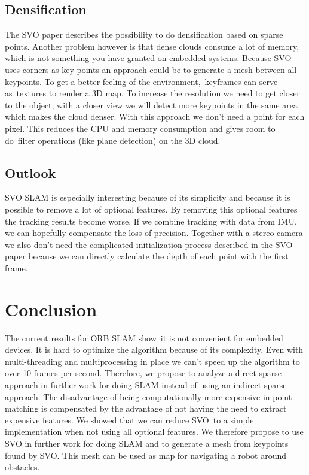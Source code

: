 \documentclass[11pt,a4paper,titlepage,oneside]{report}
\begin{document}
\section{Densification}

The SVO paper describes the possibility to do densification based on sparse points. Another problem however is that dense clouds consume a lot of memory, which is not something you have granted on embedded systems. Because SVO uses corners as key points an approach could be to generate a mesh between all keypoints. To get a better feeling of the environment, keyframes can serve as textures to render a 3D map. To increase the resolution we need to get closer to the object, with a closer view we will detect more keypoints in the same area which makes the cloud denser. With this approach we don't need a point for each pixel. This reduces the CPU and memory consumption and gives room to do filter operations (like plane detection) on the 3D cloud.

\section{Outlook}
SVO SLAM is especially interesting because of its simplicity and because it is possible to remove a lot of optional features. By removing this optional features the tracking results become worse. If we combine tracking with data from IMU, we can hopefully compensate the loss of precision. Together with a stereo camera we also don’t need the complicated initialization process described in the SVO paper because we can directly calculate the depth of each point with the first frame.

\chapter{Conclusion}
The current results for ORB SLAM show it is not convenient for embedded devices. It is hard to optimize the algorithm because of its complexity. Even with multi-threading and multiprocessing in place we can’t speed up the algorithm to over 10 frames per second. Therefore, we propose to analyze a direct sparse approach in further work for doing SLAM instead of using an indirect sparse approach. The disadvantage of being computationally more expensive in point matching is compensated by the advantage of not having the need to extract expensive features. We showed that we can reduce SVO to a simple implementation when not using all optional features. We therefore propose to use SVO in further work for doing SLAM and to generate a mesh from keypoints found by SVO. This mesh can be used as map for navigating a robot around obstacles.
\end{document}
